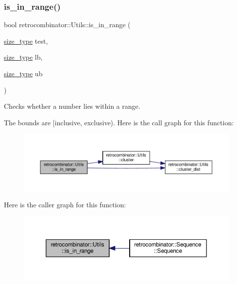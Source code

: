 \subsubsection{\texorpdfstring{is\+\_\+in\+\_\+range()}{is\_in\_range()}}
{\footnotesize\ttfamily bool retrocombinator\+::\+Utils\+::is\+\_\+in\+\_\+range (\begin{DoxyParamCaption}\item[{\hyperlink{namespaceretrocombinator_a8e1541b50cee66a791df4c437ccbb385}{size\+\_\+type}}]{test,  }\item[{\hyperlink{namespaceretrocombinator_a8e1541b50cee66a791df4c437ccbb385}{size\+\_\+type}}]{lb,  }\item[{\hyperlink{namespaceretrocombinator_a8e1541b50cee66a791df4c437ccbb385}{size\+\_\+type}}]{ub }\end{DoxyParamCaption})\hspace{0.3cm}{\ttfamily [inline]}}



Checks whether a number lies within a range. 

The bounds are \mbox{[}inclusive, exclusive). Here is the call graph for this function\+:\nopagebreak
\begin{figure}[H]
\begin{center}
\leavevmode
\includegraphics[width=350pt]{namespaceretrocombinator_1_1Utils_a984680ddd6d1f7ccee9e0f040ff16183_cgraph}
\end{center}
\end{figure}
Here is the caller graph for this function\+:\nopagebreak
\begin{figure}[H]
\begin{center}
\leavevmode
\includegraphics[width=350pt]{namespaceretrocombinator_1_1Utils_a984680ddd6d1f7ccee9e0f040ff16183_icgraph}
\end{center}
\end{figure}
